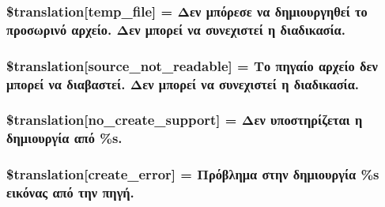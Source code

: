 \subsubsection[{\$translation}]{\setlength{\rightskip}{0pt plus 5cm}\$translation\mbox{[}\textquotesingle{}temp\+\_\+file\textquotesingle{}\mbox{]} = \textquotesingle{}Δεν μπόρεσε να δημιουργηθεί το προσωρινό αρχείο. Δεν μπορεί να συνεχιστεί η διαδικασία.\textquotesingle{}}\label{class_8upload_8el___g_r_8php_a2baece8da11e20d45175db91851ec3e3}
\hypertarget{class_8upload_8el___g_r_8php_a922967ca2df0efdd455261142d8e5715}{}
\subsubsection[{\$translation}]{\setlength{\rightskip}{0pt plus 5cm}\$translation\mbox{[}\textquotesingle{}source\+\_\+not\+\_\+readable\textquotesingle{}\mbox{]} = \textquotesingle{}Το πηγαίο αρχείο δεν μπορεί να διαβαστεί. Δεν μπορεί να συνεχιστεί η διαδικασία.\textquotesingle{}}\label{class_8upload_8el___g_r_8php_a922967ca2df0efdd455261142d8e5715}
\hypertarget{class_8upload_8el___g_r_8php_a346dfd1ade29f583dd20d345c436859f}{}
\subsubsection[{\$translation}]{\setlength{\rightskip}{0pt plus 5cm}\$translation\mbox{[}\textquotesingle{}no\+\_\+create\+\_\+support\textquotesingle{}\mbox{]} = \textquotesingle{}Δεν υποστηρίζεται η δημιουργία από \%s.\textquotesingle{}}\label{class_8upload_8el___g_r_8php_a346dfd1ade29f583dd20d345c436859f}
\hypertarget{class_8upload_8el___g_r_8php_a53013ce9255c4e1849098ddd9fdb2b3f}{}
\subsubsection[{\$translation}]{\setlength{\rightskip}{0pt plus 5cm}\$translation\mbox{[}\textquotesingle{}create\+\_\+error\textquotesingle{}\mbox{]} = \textquotesingle{}Πρόβλημα στην δημιουργία \%s εικόνας από την πηγή.\textquotesingle{}}\label{class_8upload_8el___g_r_8php_a53013ce9255c4e1849098ddd9fdb2b3f}
\hypertarget{class_8upload_8el___g_r_8php_a6ab0a660b457eaf2d3434b225449fdd6}{}
